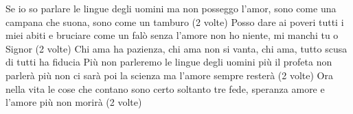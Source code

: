 \beginverse
Se io so parlare le lingue degli uomini
ma non posseggo l'amor,
sono come una campana che suona,
sono come un tamburo (2 volte)
Posso dare ai poveri tutti i miei abiti
e bruciare come un falò
senza l'amore non ho niente,
mi manchi tu o Signor (2 volte)
\endverse
\beginchorus
Chi ama ha pazienza,
chi ama non si vanta,
chi ama, tutto scusa di tutti ha fiducia
\endchorus
\beginverse
Più non parleremo le lingue degli uomini
più il profeta non parlerà
più non ci sarà poi la scienza
ma l'amore sempre resterà (2 volte)
Ora nella vita le cose che contano
sono certo soltanto tre
fede, speranza amore
e l'amore più non morirà (2 volte)
\endverse
\endsong

